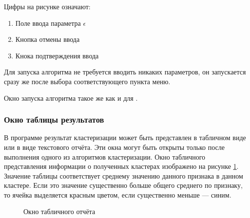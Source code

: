 \documentclass[12pt,tikz]{instruction}
\begin{document}
Цифры на рисунке означают:
\begin{enumerate}
	\item Поле ввода параметра $ \epsilon $
	\item Кнопка отмены ввода
	\item Кнока подтверждения ввода
\end{enumerate}

\textbf{\dePDDP}

Для запуска алгоритма \dePDDP не требуется вводить никаких параметров, он запускается сразу же после выбора соответствующего пункта меню.

\textbf{\IKmeans}

Окно запуска алгоритма \IKmeans такое же как и для \AWard.


\subsubsection{Окно таблицы результатов}
В программе результат кластеризации может быть представлен в табличном виде или в виде текстового отчёта.  Эти окна могут быть открыты только после выполнения одного из алгоритмов кластеризации. Окно табличного представления информации о полученных кластерах изображено на рисунке \ref{fig:table-report}. Значение таблицы соответствует среднему значению данного признака в данном кластере. Если это значение существенно больше общего среднего по признаку, то ячейка выделяется красным цветом, если существенно меньше --- синим.

\begin{figure}[H]
	\centering
	\caption{Окно табличного отчёта}
	\label{fig:table-report}
\end{figure}
\end{document}
